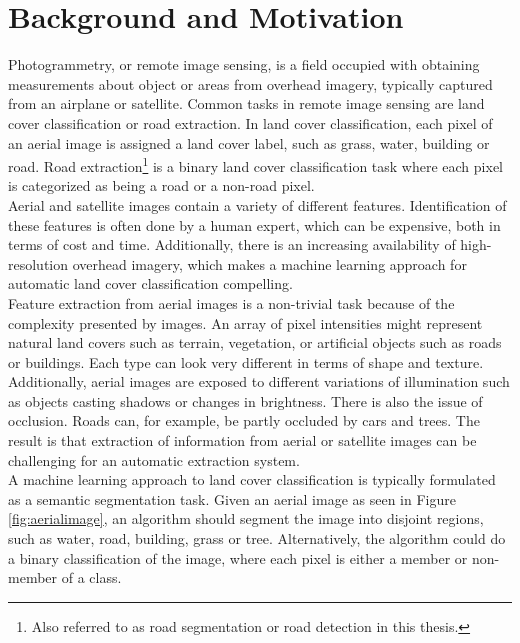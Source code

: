 \section{Background and Motivation}\label{cit}
\label{sec:BackgroundAndMotivation}
Photogrammetry, or remote image sensing, is a field occupied with obtaining measurements about object or areas from overhead imagery, typically captured from an airplane or satellite. Common tasks in remote image sensing are land cover classification or road extraction. In land cover classification, each pixel of an aerial image is assigned a land cover label, such as grass, water, building or road. Road extraction\footnote{Also referred to as road segmentation or road detection in this thesis.} is a binary land cover classification task where each pixel is categorized as being a road or a non-road pixel.\\


Aerial and satellite images contain a variety of different features. Identification of these features is often done by a human expert, which can be expensive, both in terms of cost and time. Additionally, there is an increasing availability of high-resolution overhead imagery, which makes a machine learning approach for automatic land cover classification compelling. \\

Feature extraction from aerial images is a non-trivial task because of the complexity presented by images. An array of pixel intensities might represent natural land covers such as terrain, vegetation, or artificial objects such as roads or buildings. Each type can look very different in terms of shape and texture. Additionally, aerial images are exposed to different variations of illumination such as objects casting shadows or changes in brightness. There is also the issue of occlusion. Roads can, for example, be partly occluded by cars and trees. The result is that extraction of information from aerial or satellite images can be challenging for an automatic extraction system. \\

A machine learning approach to land cover classification is typically formulated as a semantic segmentation task. Given an aerial image as seen in Figure \ref{fig:aerialimage}, an algorithm should segment the image into disjoint regions, such as water, road, building, grass or tree. Alternatively, the algorithm could do a binary classification of the image, where each pixel is either a member or non-member of a class.\\

